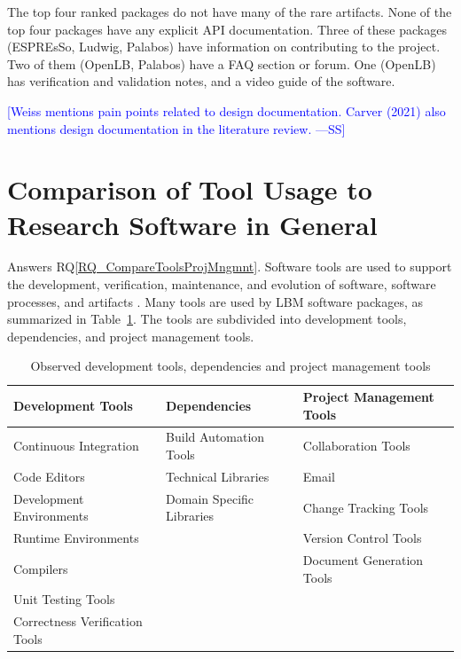 \documentclass[final, 3p, times, authoryear]{elsarticle}
\newcommand{\authornote}[3]{\textcolor{#1}{[#3 ---#2]}}
\newcommand{\authornote}[3]{}
\newcommand{\wss}[1]{\authornote{blue}{SS}{#1}} %
\newcommand{\rqref}[1]{RQ\ref{#1}}
\begin{document}
The top four ranked packages do not have many of the rare artifacts. None of the
top four packages have any explicit API documentation. Three of these packages
(ESPREsSo, Ludwig, Palabos) have information on contributing to the project. Two
of them (OpenLB, Palabos) have a FAQ section or forum. One (OpenLB) has
verification and validation notes, and a video guide of the software. 

\wss{Weiss mentions pain points related to design documentation.  Carver (2021) 
also mentions design documentation in the literature review.}

\section{Comparison of Tool Usage to Research Software in General}
\label{Sec_CompareTools}

Answers \rqref{RQ_CompareToolsProjMngmnt}.  Software tools are used to support
the development, verification, maintenance, and evolution of software, software
processes, and artifacts \citep{ghezzi1991fundamentals}. Many tools are used by
LBM software packages, as summarized in Table~\ref{tbl_tools}.  The tools are
subdivided into development tools, dependencies, and project management tools.

\begin{table}
	\begin{center}
	\begin{tabular}{ p{5.3 cm} p{4.9 cm} p{5 cm}}
	\toprule
	\textbf{Development Tools} & \textbf{Dependencies} & \textbf{Project
	Management Tools} \\
	\midrule
	Continuous Integration & Build Automation Tools & Collaboration Tools\\
	Code Editors & Technical Libraries & Email\\
	Development Environments & Domain Specific Libraries & Change Tracking Tools\\
	Runtime Environments &  & Version Control Tools\\
	Compilers &  & Document Generation Tools\\
	Unit Testing Tools &  & \\
	Correctness Verification Tools &  & \\
	\bottomrule
	\end{tabular}
	\caption{Observed development tools, dependencies and project management
	tools} \label{tbl_tools}
	\end{center}
\end{table}
\end{document}
